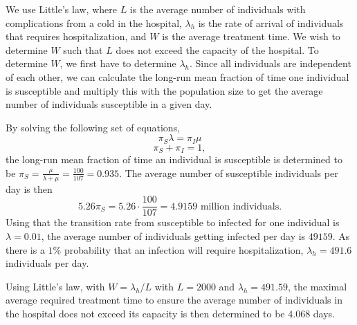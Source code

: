 We use Little's law, where $L$ is the average number of individuals with complications from a cold in the hospital, $\lambda_h$ is the rate of arrival of individuals that requires hospitalization, and $W$ is the average treatment time. We wish to determine $W$ such that $L$ does not exceed the capacity of the hospital.
To determine $W$, we first have to determine $\lambda_h$. Since all individuals are independent of each other, we can calculate the long-run mean fraction of time one individual is susceptible and multiply this with the population size to get the average number of individuals susceptible in a given day.

By solving the following set of equations,
$$ \pi_S \lambda = \pi_I \mu$$
$$ \pi_S + \pi_I = 1 ,$$ 
the long-run mean fraction of time an individual is susceptible is determined to be $\pi_S = \frac{\mu}{\lambda + \mu} = \frac{100}{107} = 0.935.$
The average number of susceptible individuals per day is then 
$$ 5.26  \pi_S = 5.26 \cdot \frac{100}{107} = 4.9159 \text{ million individuals.}$$
Using that the transition rate from susceptible to infected for one individual is $\lambda = 0.01$, the average number of individuals getting infected per day is $49159$. As there is a $1\%$ probability that an infection will require hospitalization, $\lambda_h = 491.6$ individuals per day. 

Using Little's law, with $W = \lambda_h/L$ with $L = 2000$ and $\lambda_h = 491.59$, the maximal average required treatment time to ensure the average number of individuals in the hospital does not exceed its capacity is then determined to be $4.068$ days.
